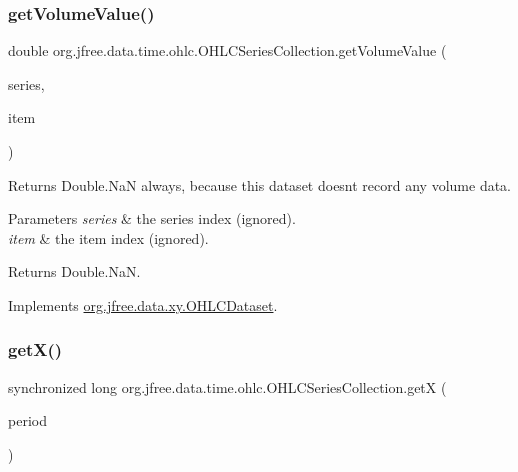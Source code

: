 \subsubsection{\texorpdfstring{get\+Volume\+Value()}{getVolumeValue()}}
{\footnotesize\ttfamily double org.\+jfree.\+data.\+time.\+ohlc.\+O\+H\+L\+C\+Series\+Collection.\+get\+Volume\+Value (\begin{DoxyParamCaption}\item[{int}]{series,  }\item[{int}]{item }\end{DoxyParamCaption})}

Returns {\ttfamily Double.\+NaN} always, because this dataset doesn\textquotesingle{}t record any volume data.


\begin{DoxyParams}{Parameters}
{\em series} & the series index (ignored). \\
\hline
{\em item} & the item index (ignored).\\
\hline
\end{DoxyParams}
\begin{DoxyReturn}{Returns}
{\ttfamily Double.\+NaN}. 
\end{DoxyReturn}


Implements \mbox{\hyperlink{interfaceorg_1_1jfree_1_1data_1_1xy_1_1_o_h_l_c_dataset_a132a37218de3b54bf308b3dcfb93cf84}{org.\+jfree.\+data.\+xy.\+O\+H\+L\+C\+Dataset}}.

\mbox{\label{classorg_1_1jfree_1_1data_1_1time_1_1ohlc_1_1_o_h_l_c_series_collection_aa5b4ab59465ee04c036189537a4ca7ae}} 
\subsubsection{\texorpdfstring{get\+X()}{getX()}\hspace{0.1cm}{\footnotesize\ttfamily [1/2]}}
{\footnotesize\ttfamily synchronized long org.\+jfree.\+data.\+time.\+ohlc.\+O\+H\+L\+C\+Series\+Collection.\+getX (\begin{DoxyParamCaption}\item[{\mbox{\hyperlink{classorg_1_1jfree_1_1data_1_1time_1_1_regular_time_period}{Regular\+Time\+Period}}}]{period }\end{DoxyParamCaption})\hspace{0.3cm}{\ttfamily [protected]}}

